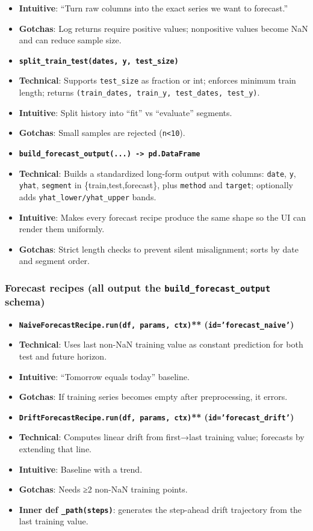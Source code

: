 \documentclass[11pt]{article}
\begin{document}
\begin{itemize}[leftmargin=*,nosep]
\item \textbf{Intuitive}: “Turn raw columns into the exact series we want to forecast.”
\item \textbf{Gotchas}: Log returns require positive values; nonpositive values become NaN and can reduce sample size.
\item \textbf{\texttt{split\_train\_test(dates, y, test\_size)}}
\item \textbf{Technical}: Supports \texttt{test\_size} as fraction or int; enforces minimum train length; returns \texttt{(train\_dates, train\_y, test\_dates, test\_y)}.
\item \textbf{Intuitive}: Split history into “fit” vs “evaluate” segments.
\item \textbf{Gotchas}: Small samples are rejected (\texttt{n<10}).
\item \textbf{\texttt{build\_forecast\_output(...) -> pd.DataFrame}}
\item \textbf{Technical}: Builds a standardized long-form output with columns: \texttt{date}, \texttt{y}, \texttt{yhat}, \texttt{segment} in \{train,test,forecast\}, plus \texttt{method} and \texttt{target}; optionally adds \texttt{yhat\_lower/yhat\_upper} bands.
\item \textbf{Intuitive}: Makes every forecast recipe produce the same shape so the UI can render them uniformly.
\item \textbf{Gotchas}: Strict length checks to prevent silent misalignment; sorts by date and segment order.
\end{itemize}


\subsubsection{Forecast recipes (all output the \texttt{build\_forecast\_output} schema)}

\begin{itemize}[leftmargin=*,nosep]
\item \textbf{\texttt{NaiveForecastRecipe.run(df, params, ctx)}** (\texttt{id='forecast\_naive'})}
\item \textbf{Technical}: Uses last non-NaN training value as constant prediction for both test and future horizon.
\item \textbf{Intuitive}: “Tomorrow equals today” baseline.
\item \textbf{Gotchas}: If training series becomes empty after preprocessing, it errors.
\item \textbf{\texttt{DriftForecastRecipe.run(df, params, ctx)}** (\texttt{id='forecast\_drift'})}
\item \textbf{Technical}: Computes linear drift from first→last training value; forecasts by extending that line.
\item \textbf{Intuitive}: Baseline with a trend.
\item \textbf{Gotchas}: Needs ≥2 non-NaN training points.
\item \textbf{Inner def \texttt{\_path(steps)}}: generates the step-ahead drift trajectory from the last training value.
\end{itemize}
\end{document}
